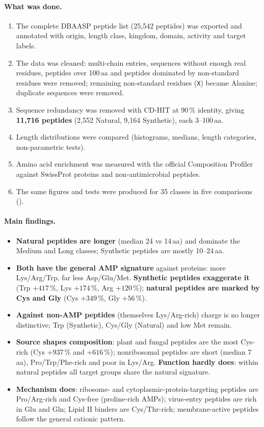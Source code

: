 \documentclass[11pt,a4paper]{article}
\newcommand{\amin}{\,aa}
\begin{document}
\paragraph{What was done.}
\begin{enumerate}
\item The complete DBAASP peptide list (25{,}542 peptides) was exported and annotated with origin, length class, kingdom, domain, activity and target labels.
\item The data was cleaned: multi-chain entries, sequences without enough real residues, peptides over 100\amin{} and peptides dominated by non-standard residues were removed;
      remaining non-standard residues (\texttt{X}) became Alanine; duplicate sequences were removed.
\item Sequence redundancy was removed with CD-HIT at 90\,\% identity, giving \textbf{11{,}716 peptides} (2{,}552 Natural, 9{,}164 Synthetic), each 3--100\amin.
\item Length distributions were compared (histograms, medians, length categories, non-parametric tests).
\item Amino acid enrichment was measured with the official Composition Profiler against SwissProt proteins and non-antimicrobial peptides.
\item The same figures and tests were produced for 35 classes in five comparisons ().
\end{enumerate}

\paragraph{Main findings.}
\begin{itemize}
\item \textbf{Natural peptides are longer} (median 24 vs 14\amin) and dominate the Medium and Long classes; Synthetic peptides are mostly 10--24\amin.
\item \textbf{Both have the general AMP signature} against proteins: more Lys/Arg/Trp, far less Asp/Glu/Met. \textbf{Synthetic peptides exaggerate it}
      (Trp $+417$\,\%, Lys $+174$\,\%, Arg $+120$\,\%); \textbf{natural peptides are marked by Cys and Gly} (Cys $+349$\,\%, Gly $+56$\,\%).
\item \textbf{Against non-AMP peptides} (themselves Lys/Arg-rich) charge is no longer distinctive; Trp (Synthetic), Cys/Gly (Natural) and low Met remain.
\item \textbf{Source shapes composition}: plant and fungal peptides are the most Cys-rich (Cys $+937$\,\% and $+616$\,\%); nonribosomal peptides are short (median 7\amin),
      Pro/Trp/Phe-rich and poor in Lys/Arg. \textbf{Function hardly does}: within natural peptides all target groups share the natural signature.
\item \textbf{Mechanism does}: ribosome- and cytoplasmic-protein-targeting peptides are Pro/Arg-rich and Cys-free (proline-rich AMPs); virus-entry peptides are rich in Glu and Gln;
      Lipid II binders are Cys/Thr-rich; membrane-active peptides follow the general cationic pattern.
\end{itemize}
\end{document}
